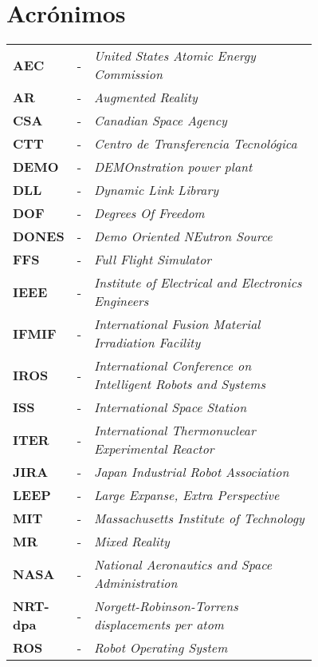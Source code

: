
\chapter*{Acrónimos}



\begin{table}[!hbt]
	\centering
	\begin{tabular}{l p{0.01\linewidth} p{0.75\linewidth}}
		\textbf{AEC} & - & \textit{United States Atomic Energy Commission} \\
		\textbf{AR} & - & \textit{Augmented Reality} \\
		\textbf{CSA} & - & \textit{Canadian Space Agency} \\
		\textbf{CTT} & - & \textit{Centro de Transferencia Tecnológica} \\
		\textbf{DEMO} & - & \textit{DEMOnstration power plant} \\
		\textbf{DLL} & - & \textit{Dynamic Link Library} \\
		\textbf{DOF} & - & \textit{Degrees Of Freedom} \\
		\textbf{DONES} & - & \textit{Demo Oriented NEutron Source} \\
		\textbf{FFS} & - & \textit{Full Flight Simulator} \\
		\textbf{IEEE} & - & \textit{Institute of Electrical and Electronics Engineers} \\
		\textbf{IFMIF} & - & \textit{International Fusion Material Irradiation Facility} \\
		\textbf{IROS} & - & \textit{International Conference on Intelligent Robots and Systems} \\
		\textbf{ISS} & - & \textit{International Space Station} \\
		\textbf{ITER} & - & \textit{International Thermonuclear Experimental Reactor} \\
		\textbf{JIRA} & - & \textit{Japan Industrial Robot Association} \\
		\textbf{LEEP} & - & \textit{Large Expanse, Extra Perspective} \\
		\textbf{MIT} & - & \textit{Massachusetts Institute of Technology} \\
		\textbf{MR} & - & \textit{Mixed Reality} \\
		\textbf{NASA} & - & \textit{National Aeronautics and Space Administration} \\
		\textbf{NRT-dpa} & - & \textit{Norgett-Robinson-Torrens displacements per atom} \\
		\textbf{ROS} & - & \textit{Robot Operating System} \\

\end{tabular}
\end{table}
